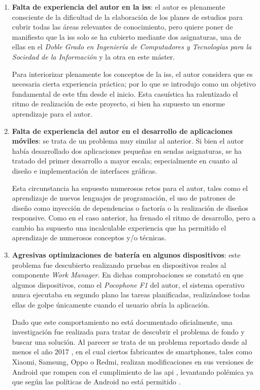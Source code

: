     \begin{enumerate}
        \item \textbf{Falta de experiencia del autor en la \gls{iss}}: el autor es plenamente consciente de la dificultad de la elaboración de los planes de estudios para cubrir todas las áreas relevantes de conocimiento, pero quiere poner de manifiesto que la \gls{iss} solo se ha cubierto mediante dos asignaturas, una de ellas en el \textit{Doble Grado en Ingeniería de Computadores y Tecnologías para la Sociedad de la Información} y la otra en este máster.
        
        Para interiorizar plenamente los conceptos de la \gls{iss}, el autor considera que es necesaria cierta experiencia práctica; por lo que se introdujo como un objetivo fundamental de este \gls{tfm} desde el inicio. Esta casuística ha ralentizado el ritmo de realización de este proyecto, si bien ha supuesto un enorme aprendizaje para el autor.
        
        \item \textbf{Falta de experiencia del autor en el desarrollo de aplicaciones móviles}: se trata de un problema muy similar al anterior. Si bien el autor había desarrollado dos aplicaciones pequeñas en sendas asignaturas, se ha tratado del primer desarrollo a mayor escala; especialmente en cuanto al diseño e implementación de interfaces gráficas.
    
        Esta circunstancia ha supuesto numerosos retos para el autor, tales como el aprendizaje de nuevos lenguajes de programación, el uso de patrones de diseño como inyección de dependencias o factoría o la realización de diseños \gls{responsive}. Como en el caso anterior, ha frenado el ritmo de desarrollo, pero a cambio ha supuesto una incalculable experiencia que ha permitido el aprendizaje de numerosos conceptos y/o técnicas.
    
        \item \textbf{Agresivas optimizaciones de batería en algunos dispositivos}: este problema fue descubierto realizando pruebas en dispositivos reales al componente \textit{Work Manager}. En dichas comprobaciones se constató en que algunos dispositivos, como el \textit{Pocophone F1} del autor, el sistema operativo nunca ejecutaba en segundo plano las tareas planificadas, realizándose todas ellas de golpe únicamente cuando el usuario abría la aplicación.
    
        Dado que este comportamiento no está documentado oficialmente, una investigación fue realizada para tratar de descubrir el problema de fondo y buscar una solución. Al parecer se trata de un problema reportado desde al menos el año 2017 \cite{mathew_why_2017}, en el cual ciertos fabricantes de \glspl{smartphone}, tales como Xiaomi, Samsung, Oppo o Redmi, realizan modificaciones en sus versiones de Android que rompen con el cumplimiento de las \gls{api} \cite{android_public_tracker_chinese_nodate} \cite{android_public_tracker_request_nodate}, levantando polémica ya que según las políticas de Android no está permitido \cite{cylon999_workmanager_2018}.
    

\end{enumerate}
